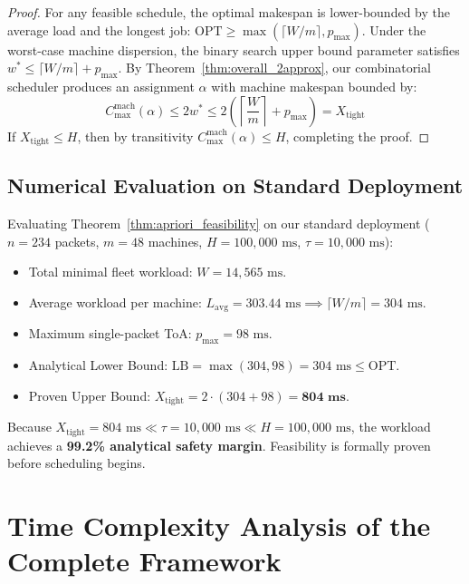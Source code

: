 \documentclass{article}
\begin{document}
\begin{proof}
For any feasible schedule, the optimal makespan is lower-bounded by the average load and the longest job: $\text{OPT} \ge \max(\lceil W/m \rceil, p_{\max})$.
Under the worst-case machine dispersion, the binary search upper bound parameter satisfies $w^* \le \lceil W/m \rceil + p_{\max}$.
By Theorem~\ref{thm:overall_2approx}, our combinatorial scheduler produces an assignment $\alpha$ with machine makespan bounded by:
\begin{equation}
C_{\max}^{\text{mach}}(\alpha) \le 2 w^* \le 2 \left( \left\lceil \frac{W}{m} \right\rceil + p_{\max} \right) = X_{\text{tight}}
\end{equation}
If $X_{\text{tight}} \le H$, then by transitivity $C_{\max}^{\text{mach}}(\alpha) \le H$, completing the proof.
\end{proof}

\subsection{Numerical Evaluation on Standard Deployment}
Evaluating Theorem~\ref{thm:apriori_feasibility} on our standard deployment ($n = 234$ packets, $m = 48$ machines, $H = 100{,}000\text{ ms}$, $\tau = 10{,}000\text{ ms}$):
\begin{itemize}
    \item Total minimal fleet workload: $W = 14{,}565\text{ ms}$.
    \item Average workload per machine: $L_{\text{avg}} = 303.44\text{ ms} \implies \lceil W/m \rceil = 304\text{ ms}$.
    \item Maximum single-packet ToA: $p_{\max} = 98\text{ ms}$.
    \item Analytical Lower Bound: $\text{LB} = \max(304, 98) = 304\text{ ms} \le \text{OPT}$.
    \item Proven Upper Bound: $X_{\text{tight}} = 2 \cdot (304 + 98) = \mathbf{804\text{ ms}}$.
\end{itemize}
Because $X_{\text{tight}} = 804\text{ ms} \ll \tau = 10{,}000\text{ ms} \ll H = 100{,}000\text{ ms}$, the workload achieves a \textbf{99.2\% analytical safety margin}. Feasibility is formally proven before scheduling begins.

\section{Time Complexity Analysis of the Complete Framework}
\label{sec:time_complexity}
\end{document}
